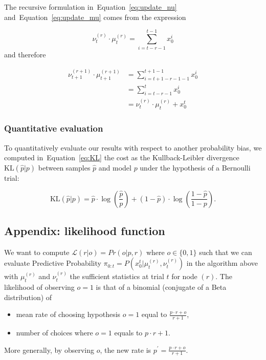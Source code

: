 \documentclass[10pt,letterpaper]{article}
\newcommand{\KL}[2]{\text{KL}( #1 | #2 )}
\newcommand{\pa}[1]{\left( #1 \right)}
\newcommand{\eq}[1]{\begin{equation*}#1\end{equation*}}
\newcommand{\eqs}[1]{\begin{align*}#1\end{align*}}
\newcommand{\Ll}{\mathcal{L}}
\newcommand{\seeEq}[1]{Equation~\ref{eq:#1}}
\newcommand{\seeApp}[1]{Appendix~\ref{app:#1}}
\begin{document}
The recursive formulation in~\seeEq{update_nu} and~\seeEq{update_mu} comes from the expression

 \eq{
\nu^{(r)}_{t} \cdot \mu^{(r)}_{t} = \sum_{i=t-r-1}^{t-1} x_0^i %
}
and therefore

\eqs{
\nu^{(r+1)}_{t+1} \cdot \mu^{(r+1)}_{t+1} 	&= \sum_{i=t+1-r-1-1}^{t+1-1} x_0^i  \\%
											&=  \sum_{i=t-r-1}^{t} x_0^i  \\%
											&= \nu^{(r)}_{t} \cdot  \mu^{(r)}_{t} +  x_0^t
}

%
%

\subsubsection{Quantitative evaluation}

To quantitatively evaluate our results with respect to another probability bias, we computed in~\seeEq{KL} the cost as the Kullback-Leibler divergence  $\KL{\hat p}{p}$ between samples $\hat p$ and model $p$ under the hypothesis of a Bernoulli trial:

\begin{equation}
\KL{\hat p}{p} = \hat{p} \cdot\log\pa{\frac{\hat p}{p}} + (1-\hat p)\cdot \log\pa{\frac{1-\hat p}{1-p}}.
\end{equation}


\subsection{Appendix: likelihood function}
\label{app:likelihood}


We want to compute $\Ll(r | o) = Pr(o | p, r)$ where $o \in \{ 0, 1 \}$ such that we can evaluate Predictive Probability $\pi_{0:t} = P(x_0^t  |\mu^{(r)}_t,\nu^{(r)}_t)$ in the algorithm above with $\mu^{(r)}_t$ and $\nu^{(r)}_t$ the sufficient statistics at trial $t$ for node $(r)$.
The likelihood of observing $o=1$ is that of a binomial (conjugate of a Beta distribution) of
	\begin{itemize}
		\item  mean rate of choosing hypothesis $o=1$ equal to $\frac{p\cdot r + o}{r+1}$,
		\item number of choices where  $o=1$ equals to $p\cdot r+1$.
	\end{itemize}
More generally, by observing $o$, the new rate is $p^{'} = \frac{p\cdot r + o}{r+1}$.
\end{document}
